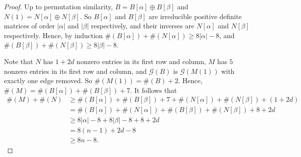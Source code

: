 \documentclass[10pt,a4paper]{amsart}
\newcommand{\G}{\mathcal{G}}
\begin{document}
\begin{proof}
Up to permutation similarity, 
$B= B[\alpha]  \oplus B[\beta ]$
and $N(1)= N[\alpha] \oplus N[\beta]$. So $B[\alpha]$ and $B[\beta]$ are irreducible positive definite matrices of order $|\alpha|$ and $|\beta|$ respectively, and their inverses are $N[\alpha]$ and $N[\beta]$ respectively. 
Hence, by induction $\#(B[\alpha]) + \#(N[\alpha])\geq 8|\alpha| - 8$, and 
$\#(B[\beta]) + \#(N[\beta])\geq 8|\beta|-8$.


Note that $N$ has $1+ 2 {d}$ nonzero entries in its first row and column,  $M$ has $5$ nonzero entries in its first row and column, and $\G(B)$ is $\G(M(1))$ with exactly one edge removed.  
So $\#(M(1))=
\#(B)+2$. Hence, $\#(M) =\#(B[\alpha]) + \#(B[\beta])+7$.
It follows that 
\begin{align*} 
\#(M) +\#(N)  
&\geq \#(B[\alpha]) + \#(B[\beta]) +7 + \#(N[\alpha]) + \#(N[\beta]) + (1+ 2d)
\\
&= \#(B[\alpha]) + \#(N[\alpha])+ \#(B[\beta]) + \#(N[\beta]) +8 + 2d \\
&\geq 8|\alpha|-8+ 8|\beta|-8 + 8+ 2d \\
&=8(n-1) + 2d -8 
\\
&\geq 8n-8.
\end{align*}
\qedhere 
\end{proof}
\end{document}
